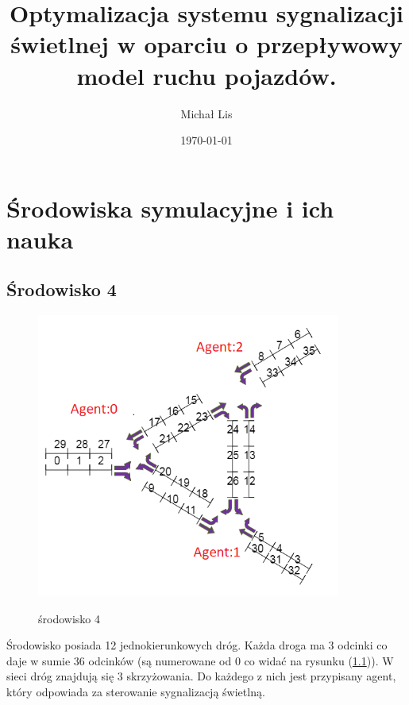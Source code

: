 \documentclass[12pt]{book}
\theoremstyle{plain}
\let\oldref\ref
\renewcommand{\ref}[1]{(\oldref{#1})}
\begin{document}
		
	\title{Optymalizacja  systemu sygnalizacji świetlnej w 
		oparciu o przepływowy model ruchu pojazdów.}
	\author{Michał Lis}
	\date{\today}
	\maketitle
	\tableofcontents
	
	\chapter {Środowiska symulacyjne i ich nauka}
	\section{Środowisko 4}
	\begin{figure}[H]
		\centering
		\includegraphics[width=10cm]{env_4_agenci}
		\label{fig:env_4_agenci}
		\caption{środowisko 4}
	\end{figure}
	
	Środowisko posiada 12 jednokierunkowych dróg. Każda droga ma 3 odcinki co daje w sumie 36 odcinków (są numerowane od 0 co widać na rysunku \ref{fig:env_4_agenci}).
	W sieci dróg znajdują się 3 skrzyżowania. Do każdego z nich jest przypisany agent, który odpowiada za sterowanie sygnalizacją świetlną.
	
\end{document}
